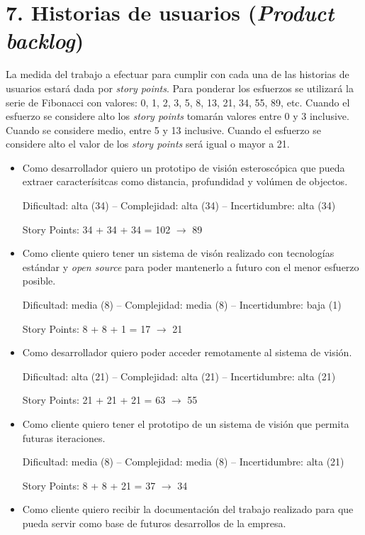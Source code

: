 \documentclass[
11pt, %
]{charter}
\begin{document}
\section{7. Historias de usuarios (\textit{Product backlog})}
\label{sec:backlog}
La medida del trabajo a efectuar para cumplir con cada una de las historias de usuarios estará dada por \emph{story points}. Para ponderar los esfuerzos se utilizará la serie de Fibonacci con valores: 0, 1, 2, 3, 5, 8, 13, 21, 34, 55, 89, etc. Cuando el esfuerzo se considere alto los \emph{story points} tomarán valores entre 0 y 3 inclusive. Cuando se considere medio, entre 5 y 13 inclusive. Cuando el esfuerzo se considere alto el valor de los \emph{story points} será igual o mayor a 21.

\begin{itemize}
\item Como desarrollador quiero un prototipo de visión esteroscópica que pueda extraer caracterísitcas como distancia, profundidad y volúmen de objectos. 

Dificultad: alta (34) -- Complejidad: alta (34)  -- Incertidumbre: alta (34)

Story Points: 34 + 34 + 34 = 102 $\rightarrow$ 89

\item Como cliente quiero tener un sistema de visón realizado con tecnologías estándar y \emph{open source} para poder mantenerlo a futuro con el menor esfuerzo posible.

Dificultad: media (8) -- Complejidad: media (8) -- Incertidumbre: baja (1)

Story Points: 8 + 8 + 1 = 17 $\rightarrow$ 21

\item Como desarrollador quiero poder acceder remotamente al sistema de visión.

Dificultad: alta (21)  -- Complejidad: alta (21) -- Incertidumbre: alta (21)

Story Points: 21 + 21 + 21 = 63 $\rightarrow$  55

\item Como cliente quiero tener el prototipo de un sistema de visión que permita futuras iteraciones.

Dificultad: media (8) -- Complejidad: media (8) -- Incertidumbre: alta (21)

Story Points: 8 + 8 + 21 = 37 $\rightarrow$ 34

\item Como cliente quiero recibir la documentación del trabajo realizado para que pueda servir como base de futuros desarrollos de la empresa.


\end{itemize}
\end{document}
